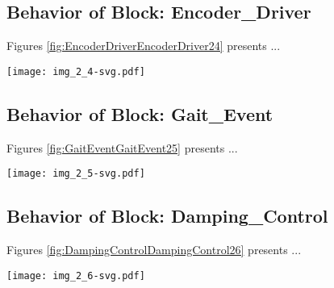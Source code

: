 \subsection{Behavior of Block: Encoder\_Driver}
Figures \ref{fig:EncoderDriverEncoderDriver24} presents ...
\begin{figure*}[htb]
\centering
\texttt{[image: img\_2\_4-svg.pdf]}
\caption{Diagram "Behavior of Block: Encoder\_Driver"}
\label{fig:EncoderDriverEncoderDriver24}
\end{figure*}

\subsection{Behavior of Block: Gait\_Event}
Figures \ref{fig:GaitEventGaitEvent25} presents ...
\begin{figure*}[htb]
\centering
\texttt{[image: img\_2\_5-svg.pdf]}
\caption{Diagram "Behavior of Block: Gait\_Event"}
\label{fig:GaitEventGaitEvent25}
\end{figure*}

\subsection{Behavior of Block: Damping\_Control}
Figures \ref{fig:DampingControlDampingControl26} presents ...
\begin{figure*}[htb]
\centering
\texttt{[image: img\_2\_6-svg.pdf]}
\caption{Diagram "Behavior of Block: Damping\_Control"}
\label{fig:DampingControlDampingControl26}
\end{figure*}

